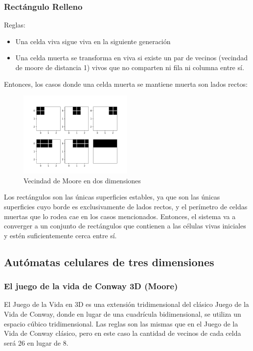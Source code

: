 \subsubsection{Rectángulo Relleno}
Reglas:
\begin{itemize}
    \item Una celda viva sigue viva en la siguiente generación
    \item Una celda muerta se transforma en viva si existe un par de vecinos (vecindad de moore de distancia 1) vivos que no comparten ni fila ni columna entre sí.
\end{itemize}
Entonces, los casos donde una celda muerta se mantiene muerta son lados rectos:
\begin{figure}[H]
    \centering
    \includegraphics[width=0.5\textwidth]{Images/fill_example_1a}
    \caption{Vecindad de Moore en dos dimensiones}
    \label{fig:fill}
\end{figure}
Los rectángulos son las únicas superficies estables, ya que son las únicas superficies cuyo borde es exclusivamente de lados rectos, y el perímetro de celdas muertas que lo rodea cae en los casos mencionados.
Entonces, el sistema va a converger a un conjunto de rectángulos que contienen a las células vivas iniciales y estén suficientemente cerca entre sí.

\subsection{Autómatas celulares de tres dimensiones}
\label{subsec:3d}

\subsubsection{El juego de la vida de Conway 3D (Moore)}
El Juego de la Vida en 3D es una extensión tridimensional del clásico Juego de la Vida de Conway, donde en lugar de una cuadrícula bidimensional, se utiliza un espacio cúbico tridimensional.
Las reglas son las mismas que en el Juego de la Vida de Conway clásico, pero en este caso la cantidad de vecinos de cada celda será 26 en lugar de 8.

